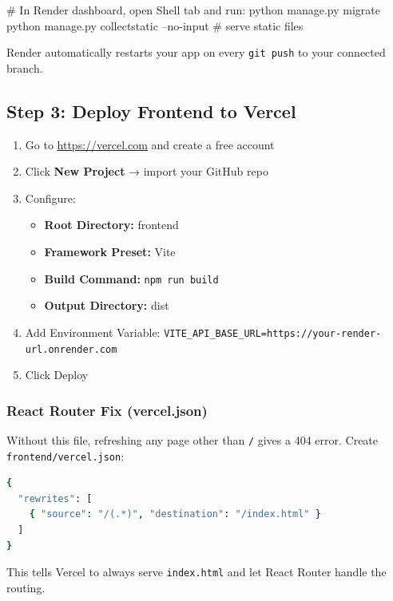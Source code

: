 \documentclass[12pt,a4paper]{article}
\begin{document}
\begin{termbox}
# In Render dashboard, open Shell tab and run:
python manage.py migrate
python manage.py collectstatic --no-input  # serve static files
\end{termbox}

\begin{notebox}
Render automatically restarts your app on every \texttt{git push} to your connected branch.
\end{notebox}

\subsection{Step 3: Deploy Frontend to Vercel}

\begin{enumerate}
    \item Go to \url{https://vercel.com} and create a free account
    \item Click \textbf{New Project} → import your GitHub repo
    \item Configure:
    \begin{itemize}
        \item \textbf{Root Directory:} frontend
        \item \textbf{Framework Preset:} Vite
        \item \textbf{Build Command:} \texttt{npm run build}
        \item \textbf{Output Directory:} dist
    \end{itemize}
    \item Add Environment Variable: \texttt{VITE\_API\_BASE\_URL=https://your-render-url.onrender.com}
    \item Click Deploy
\end{enumerate}

\subsubsection{React Router Fix (vercel.json)}
Without this file, refreshing any page other than \texttt{/} gives a 404 error. Create \texttt{frontend/vercel.json}:

\begin{lstlisting}[language=bash]
{
  "rewrites": [
    { "source": "/(.*)", "destination": "/index.html" }
  ]
}
\end{lstlisting}

This tells Vercel to always serve \texttt{index.html} and let React Router handle the routing.
\end{document}
